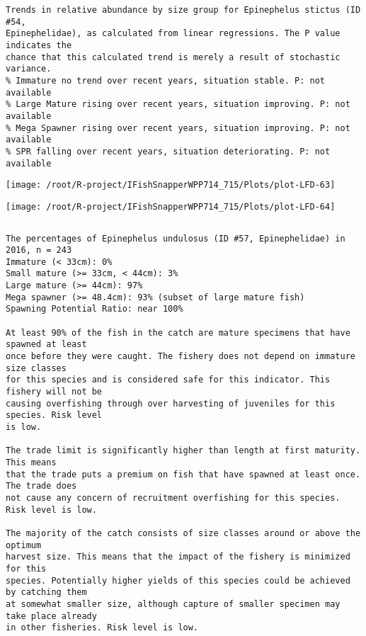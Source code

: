 \documentclass{report}\usepackage[]{graphicx}\usepackage[]{color}
\makeatletter
\def\maxwidth{ %
  \ifdim\Gin@nat@width>\linewidth
    \linewidth
  \else
    \Gin@nat@width
  \fi
}
\newenvironment{kframe}{%
 \def\at@end@of@kframe{}%
 \ifinner\ifhmode%
  \def\at@end@of@kframe{\end{minipage}}%
  \begin{minipage}{\columnwidth}%
 \fi\fi%
 \def\FrameCommand##1{\hskip\@totalleftmargin \hskip-\fboxsep
 \colorbox{shadecolor}{##1}\hskip-\fboxsep
     \hskip-\linewidth \hskip-\@totalleftmargin \hskip\columnwidth}%
 \MakeFramed {\advance\hsize-\width
   \@totalleftmargin\z@ \linewidth\hsize
   \@setminipage}}%
 {\par\unskip\endMakeFramed%
 \at@end@of@kframe}
\newenvironment{knitrout}{}{} %
\makeatother
\begin{document}
\begin{knitrout}
\begin{kframe}
\begin{verbatim}
Trends in relative abundance by size group for Epinephelus stictus (ID #54,
Epinephelidae), as calculated from linear regressions. The P value indicates the
chance that this calculated trend is merely a result of stochastic variance.
% Immature no trend over recent years, situation stable. P: not available
% Large Mature rising over recent years, situation improving. P: not available
% Mega Spawner rising over recent years, situation improving. P: not available
% SPR falling over recent years, situation deteriorating. P: not available
\end{verbatim}
\end{kframe}
\texttt{[image: /root/R-project/IFishSnapperWPP714\_715/Plots/plot-LFD-63]} 

\texttt{[image: /root/R-project/IFishSnapperWPP714\_715/Plots/plot-LFD-64]} 
\begin{kframe}\begin{verbatim}
\end{verbatim}
\end{kframe}
\clearpage
\newpage
\begin{kframe}\begin{verbatim}The percentages of Epinephelus undulosus (ID #57, Epinephelidae) in 2016, n = 243
Immature (< 33cm): 0%
Small mature (>= 33cm, < 44cm): 3%
Large mature (>= 44cm): 97%
Mega spawner (>= 48.4cm): 93% (subset of large mature fish)
Spawning Potential Ratio: near 100%
 
At least 90% of the fish in the catch are mature specimens that have spawned at least
once before they were caught. The fishery does not depend on immature size classes
for this species and is considered safe for this indicator. This fishery will not be
causing overfishing through over harvesting of juveniles for this species. Risk level
is low.

The trade limit is significantly higher than length at first maturity.  This means
that the trade puts a premium on fish that have spawned at least once. The trade does
not cause any concern of recruitment overfishing for this species. Risk level is low.

The majority of the catch consists of size classes around or above the optimum
harvest size. This means that the impact of the fishery is minimized for this
species. Potentially higher yields of this species could be achieved by catching them
at somewhat smaller size, although capture of smaller specimen may take place already
in other fisheries. Risk level is low.


\end{verbatim}
\end{kframe}
\end{knitrout}
\end{document}
